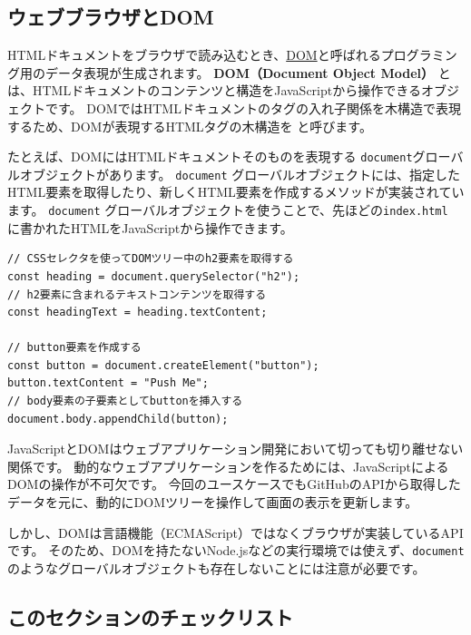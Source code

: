 \hypertarget{web-browsers-and-dom}{%
\subsection{ウェブブラウザとDOM}\label{web-browsers-and-dom}}

HTMLドキュメントをブラウザで読み込むとき、\href{https://developer.mozilla.org/ja/docs/Web/API/Document_Object_Model/Introduction}{DOM}と呼ばれるプログラミング用のデータ表現が生成されます。
\textbf{DOM（Document Object Model）}
とは、HTMLドキュメントのコンテンツと構造をJavaScriptから操作できるオブジェクトです。
DOMではHTMLドキュメントのタグの入れ子関係を木構造で表現するため、DOMが表現するHTMLタグの木構造を
\textbf{}と呼びます。

たとえば、DOMにはHTMLドキュメントそのものを表現する
\texttt{document}グローバルオブジェクトがあります。
\texttt{document}
グローバルオブジェクトには、指定したHTML要素を取得したり、新しくHTML要素を作成するメソッドが実装されています。
\texttt{document}
グローバルオブジェクトを使うことで、先ほどの\texttt{index.html}
に書かれたHTMLをJavaScriptから操作できます。

\begin{lstlisting}
// CSSセレクタを使ってDOMツリー中のh2要素を取得する
const heading = document.querySelector("h2");
// h2要素に含まれるテキストコンテンツを取得する
const headingText = heading.textContent;

// button要素を作成する
const button = document.createElement("button");
button.textContent = "Push Me";
// body要素の子要素としてbuttonを挿入する
document.body.appendChild(button);
\end{lstlisting}

JavaScriptとDOMはウェブアプリケーション開発において切っても切り離せない関係です。
動的なウェブアプリケーションを作るためには、JavaScriptによるDOMの操作が不可欠です。
今回のユースケースでもGitHubのAPIから取得したデータを元に、動的にDOMツリーを操作して画面の表示を更新します。

しかし、DOMは言語機能（ECMAScript）ではなくブラウザが実装しているAPIです。
そのため、DOMを持たないNode.jsなどの実行環境では使えず、\texttt{document}のようなグローバルオブジェクトも存在しないことには注意が必要です。

\hypertarget{section-checklist}{%
\subsection{このセクションのチェックリスト}\label{section-checklist}}

